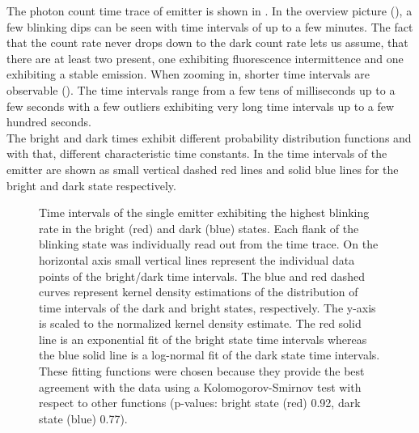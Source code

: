 		The photon count time trace of emitter \emnarrow is shown in .
		In the overview picture (), a few blinking dips can be seen with time intervals of up to a few minutes.
		The fact that the count rate never drops down to the dark count rate lets us assume, that there are at least two \sivs present, one exhibiting fluorescence intermittence and one exhibiting a stable emission.
		When zooming in, shorter time intervals are observable ().
		The time intervals range from a few tens of milliseconds up to a few seconds with a few outliers exhibiting very long time intervals up to a few hundred seconds.
		\\
		The bright and dark times exhibit different probability distribution functions and with that, different characteristic time constants.
		In  the time intervals of the emitter are shown as small vertical dashed red lines and solid blue lines for the bright and dark state respectively.

		\begin{figure}[htp]
			\centering
			\caption[Distributions of brigth and dark state intervals]{Time intervals of the single emitter exhibiting the highest blinking rate in the bright (red) and dark (blue) states. Each flank of the blinking state was individually read out from the \pl time trace. On the horizontal axis small vertical lines represent the individual data points of the bright/dark time intervals. The blue and red dashed curves represent kernel density estimations of the distribution of time intervals of the dark and bright states, respectively. The y-axis is scaled to the normalized kernel density estimate. The red solid line is an exponential fit of the bright state time intervals whereas the blue solid line is a log-normal fit of the dark state time intervals. These fitting functions were chosen because they provide the best agreement with the data using a Kolomogorov-Smirnov test with respect to other functions (p-values: bright state (red) 0.92, dark state (blue) 0.77).}
			\label{fig::fit_blink_distr}
		\end{figure}

